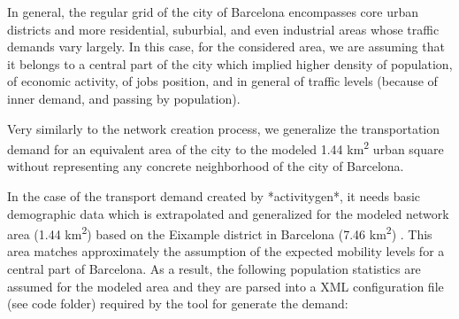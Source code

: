 \documentclass[11pt]{article}
\begin{document}
In general, the regular grid of the city of Barcelona encompasses core urban districts and more residential, suburbial, and even industrial areas whose traffic demands vary largely. In this case, for the considered area, we are assuming that it belongs to a central part of the city which implied higher density of population, of economic activity, of jobs position, and in general of traffic levels (because of inner demand, and passing by population).

Very similarly to the network creation process, we generalize the transportation demand for an equivalent area of the city to the modeled 1.44 km\textsuperscript{2} urban square without representing any concrete neighborhood of the city of Barcelona.

In the case of the transport demand created by *activitygen*, it needs basic demographic data which is extrapolated and generalized for the modeled network area (1.44 km\textsuperscript{2}) based on the Eixample district in Barcelona (7.46 km\textsuperscript{2}) \citep{AjuntamentdeBarcelona2018, AreadeBarcelona.AutoritatdelTransportMetropolita2020, DepartamentdAnalisiOficinaMunicipaldeDades.AjuntamentdeBarcelona2020}. This area matches approximately the assumption of the expected mobility levels for a central part of Barcelona. As a result, the following population statistics are assumed for the modeled area and they are parsed into a XML configuration file (see code folder) required by the tool for generate the demand:

\begin{table}[htbp]
\centering
\caption{Population statistics for the modeled area used in ACTIVITYGEN}
\label{tab:pop-stats}
\end{table}
\end{document}
